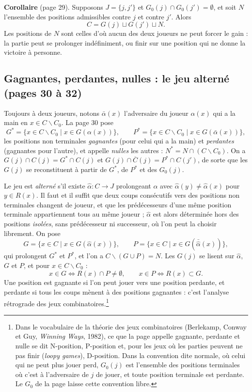 \documentclass[11pt,a4paper]{article}
\begin{document}
\textbf{Corollaire} (page 29). Supposons $J = \{j, j'\}$ et
$G_0(j) \cap G_0(j') = \emptyset$, et soit $N$ l'ensemble des positions
admissibles contre $j$ et contre $j'$. Alors
\[
C = G(j) \sqcup G(j') \sqcup N .
\]
Les positions de $N$ sont celles d'où aucun des deux joueurs ne peut forcer
le gain : la partie peut se prolonger indéfiniment, ou finir sur une position
qui ne donne la victoire à personne.

\subsection*{Gagnantes, perdantes, nulles : le jeu alterné (pages 30 à 32)}

Toujours à deux joueurs, notons $\bar\alpha(x)$ l'adversaire du joueur
$\alpha(x)$ qui a la main en $x \in C \smallsetminus C_0$. La page 30 pose
\[
G^* = \{x \in C \smallsetminus C_0 \mid x \in G(\alpha(x))\},
\qquad
P^* = \{x \in C \smallsetminus C_0 \mid x \in G(\bar\alpha(x))\},
\]
les positions non terminales \emph{gagnantes} (pour celui qui a la main) et
\emph{perdantes} (gagnantes pour l'autre), et appelle \emph{nulles} les
autres : $N^* = N \cap (C \smallsetminus C_0)$. On a
$G(j) \cap C(j) = G^* \cap C(j)$ et
$G(j) \cap \overline{C}(j) = P^* \cap C(j')$, de sorte que les $G(j)$ se
reconstituent à partir de $G^*$, de $P^*$ et des $G_0(j)$.

Le jeu est \emph{alterné} s'il existe $\hat\alpha : C \to J$ prolongeant
$\alpha$ avec $\hat\alpha(y) \neq \hat\alpha(x)$ pour $y \in R(x)$. Il faut et
il suffit que deux coups consécutifs vers des positions non terminales
changent de joueur, et que les prédécesseurs d'une même position terminale
appartiennent tous au même joueur ; $\hat\alpha$ est alors déterminée hors des
positions \emph{isolées}, sans prédécesseur ni successeur, où l'on peut la
choisir librement. On pose
\[
G = \{x \in C \mid x \in G(\hat\alpha(x))\},
\qquad
P = \{x \in C \mid x \in G(\bar{\hat\alpha}(x))\},
\]
qui prolongent $G^*$ et $P^*$, et l'on a $C \smallsetminus (G \cup P) = N$.
Les $G(j)$ se lisent sur $\hat\alpha$, $G$ et $P$, et pour
$x \in C \smallsetminus C_0$ :
\[
x \in G \iff R(x) \cap P \neq \emptyset,
\qquad
x \in P \iff R(x) \subset G .
\]
Une position est gagnante si l'on peut jouer vers une position perdante, et
perdante si tous les coups mènent à des positions gagnantes : c'est
l'analyse rétrograde des jeux combinatoires.\footnote{Dans le vocabulaire de
la théorie des jeux combinatoires (Berlekamp, Conway et Guy, \emph{Winning
Ways}, 1982), ce que la page appelle gagnante, perdante et nulle se dit
N-position, P-position et, pour les jeux où les parties peuvent ne pas finir
(\emph{loopy games}), D-position. Dans la convention dite normale, où celui
qui ne peut plus jouer perd, $G_0(j)$ est l'ensemble des positions terminales
où c'est à l'adversaire de $j$ de jouer, et toute position terminale est
perdante. Le $G_0$ de la page laisse cette convention libre.}
\end{document}
